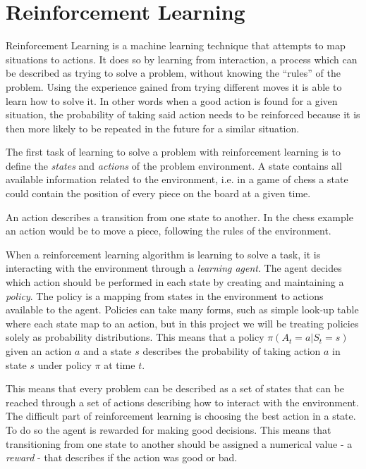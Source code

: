 \documentclass[11pt]{article}
\begin{document}
\maketitle

\section{Reinforcement Learning}

Reinforcement Learning is a machine learning technique that attempts 
to map situations to actions.
It does so by learning from interaction, a process which can be described as trying to solve a problem,
without knowing the “rules” of the problem.
Using the experience gained from trying different moves it is able to learn how to solve it.
In other words when a good action is found for a given situation,
the probability of taking said action needs to be reinforced because it is then more likely to be
repeated in the future for a similar situation.

The first task of learning to solve a problem with reinforcement learning is to define
the \textit{states} and \textit{actions} of the problem environment.
A state contains all available information related to the environment,
i.e. in a game of chess a state could contain the position of every piece on the board at
a given time.

An action describes a transition from one state to another.
In the chess example an action would be to move a piece, following the rules of the
environment.

When a reinforcement learning algorithm is learning to solve a task, it is
interacting with the environment through a \textit{learning agent}.
The agent decides which action should be performed in each state by creating and maintaining a \textit{policy}.
The policy is a mapping from states in the environment to actions available to the agent\cite{RLbook}.
Policies can take many forms, such as simple look-up table where each state map to an
action, but in this project we will be treating policies solely as probability distributions.
This means that a policy $\pi(A_t = a|S_t = s)$ given an action $a$ and a state $s$ describes the
probability of taking action $a$ in state $s$ under policy $\pi$ at time $t$.

This means that every problem can be described as a set of states that can be reached
through a set of actions describing how to interact with the environment.
The difficult part of reinforcement learning is choosing the best action in a
state.
To do so the agent is rewarded for making good decisions.
This means that transitioning from one state to another should be assigned a numerical value
- a \textit{reward} - that describes if the action was good or bad.
\end{document}
